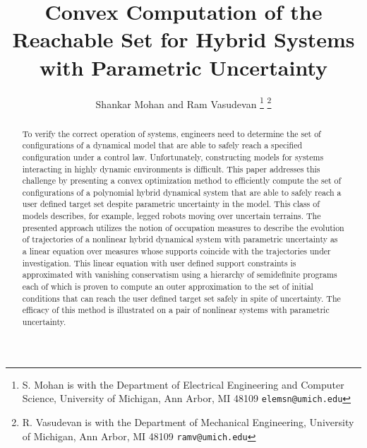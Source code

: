 \documentclass[letterpaper]{ieeeconf}
\title{Convex Computation of the Reachable Set for Hybrid Systems with Parametric Uncertainty}
\author{Shankar Mohan and Ram Vasudevan \vspace*{-0.75cm}
 \thanks{S. Mohan is with the Department of Electrical Engineering and Computer Science, University of Michigan, Ann Arbor, MI 48109
{\scriptsize \texttt{elemsn@umich.edu}}}
 \thanks{R. Vasudevan is with the Department of Mechanical Engineering, University of Michigan, Ann Arbor, MI 48109
{\scriptsize \texttt{ramv@umich.edu}}}%
}
\theoremstyle{definition}
\begin{document}
\maketitle
  \begin{abstract}
  	To verify the correct operation of systems, engineers need to determine the set of configurations of a dynamical model that are able to safely reach a specified configuration under a control law.
	Unfortunately, constructing models for systems interacting in highly dynamic environments is difficult.
	This paper addresses this challenge by presenting a convex optimization method to efficiently compute the set of configurations of a polynomial hybrid dynamical system that are able to safely reach a user defined target set despite parametric uncertainty in the model.
	This class of models describes, for example, legged robots moving over uncertain terrains.
	The presented approach utilizes the notion of occupation measures to describe the evolution of trajectories of a nonlinear hybrid dynamical system with parametric uncertainty as a linear equation over measures whose supports coincide with the trajectories under investigation.
	This linear equation with user defined support constraints is approximated with vanishing conservatism using a hierarchy of semidefinite programs each of which is proven to compute an outer approximation to the set of initial conditions that can reach the user defined target set safely in spite of uncertainty.
	The efficacy of this method is illustrated on a pair of nonlinear systems with parametric uncertainty.
  \end{abstract}
  
  
  
  
  
  


\end{document}
